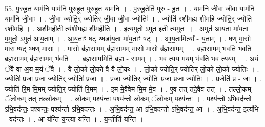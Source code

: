 \documentclass[17pt]{extarticle}
\begin{document}
55. पु॒रु॒हू॒त॒ याम॑नि॒ याम॑नि पुरुहूत पुरुहूत॒ याम॑नि । . पु॒रु॒हू॒तेति॑ पुरु - हू॒त॒ । . याम॑नि जी॒वा जी॒वा याम॑नि॒ याम॑नि जी॒वाः । . जी॒वा ज्योति॒र् ज्योति॑र् जी॒वा जी॒वा ज्योतिः॑ । . ज्योति॑ रशीमह्य शीमहि॒ ज्योति॒र् ज्योति॑ रशीमहि । . अ॒शी॒म॒हीती त्य॑शीमह्य शीम॒हीति॑ । . इत्य॒मुतो॒ ऽमुत॒ इती त्य॒मुतः॑ । . अ॒मुत॑ आय॒ता मा॑य॒ता म॒मुतो॒ ऽमुत॑ आय॒ताम् । . आ॒य॒ताꣳ षट् थ्षडा॑य॒ता मा॑य॒ताꣳ षट् । . आ॒य॒तामित्या᳚ - य॒ताम् । . षण् मा॒सो मा॒स ष्षट् थ्षण् मा॒सः । . मा॒सो ब्र॑ह्मसा॒मम् ब्र॑ह्मसा॒मम् मा॒सो मा॒सो ब्र॑ह्मसा॒मम् । . ब्र॒ह्म॒सा॒मम् भ॑वति भवति ब्रह्मसा॒मम् ब्र॑ह्मसा॒मम् भ॑वति । . ब्र॒ह्म॒सा॒ममिति॑ ब्रह्म - सा॒मम् । . भ॒व॒ त्य॒य म॒यम् भ॑वति भव त्य॒यम् । . अ॒यं ॅवै वा अ॒य म॒यं ॅवै । . वै लो॒को लो॒को वै वै लो॒कः । . लो॒को ज्योति॒र् ज्योति॑र् लो॒को लो॒को ज्योतिः॑ । . ज्योतिः॑ प्र॒जा प्र॒जा ज्योति॒र् ज्योतिः॑ प्र॒जा । . प्र॒जा ज्योति॒र् ज्योतिः॑ प्र॒जा प्र॒जा ज्योतिः॑ । . प्र॒जेति॑ प्र - जा । . ज्योति॑ रि॒म मि॒मम् ज्योति॒र् ज्योति॑ रि॒मम् । . इ॒म मे॒वैवेम मि॒म मे॒व । . ए॒व तत् तदे॒वैव तत् । . तल्लो॒कम् ॅलो॒कम् तत् तल्लो॒कम् । . लो॒कम् पश्य॑न्तः॒ पश्य॑न्तो लो॒कम् ॅलो॒कम् पश्य॑न्तः । . पश्य॑न्तो ऽभि॒वद॑न्तो ऽभि॒वद॑न्तः॒ पश्य॑न्तः॒ पश्य॑न्तो ऽभि॒वद॑न्तः । . अ॒भि॒वद॑न्त॒ आ ऽभि॒वद॑न्तो ऽभि॒वद॑न्त॒ आ । . अ॒भि॒वद॑न्त॒ इत्य॑भि - वद॑न्तः । . आ य॑न्ति य॒न्त्या य॑न्ति । . य॒न्तीति॑ यन्ति । \newline
\end{document}
